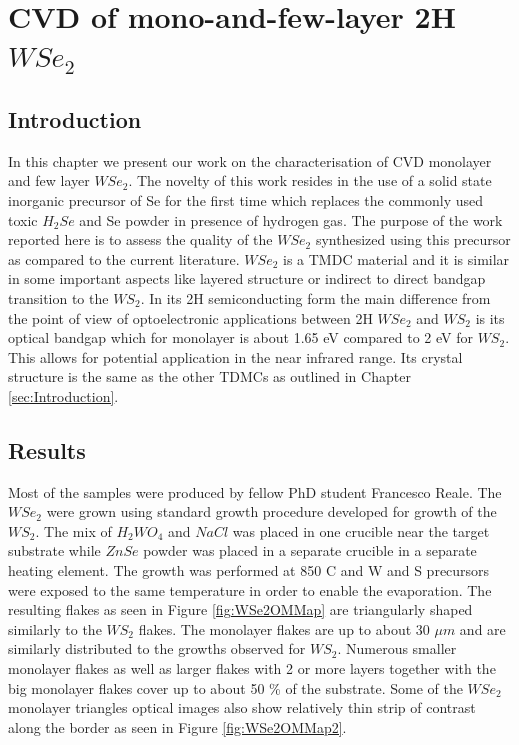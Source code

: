 \chapter{CVD of mono-and-few-layer 2H $WSe_2$}

\section{Introduction}
	
In this chapter we present our work on the characterisation of CVD monolayer and few layer $WSe_2$. The novelty of this work resides in the use of a solid state inorganic precursor of Se for the first time which replaces the commonly used toxic $H_2Se$ and Se powder in presence of hydrogen gas. The purpose of the work reported here is to assess the quality of the $WSe_2$ synthesized using this precursor as compared to the current literature. $WSe_2$ is a TMDC material and it is similar in some important aspects like layered structure or indirect to direct bandgap transition to the $WS_2$. In its 2H semiconducting form the main difference from the point of view of optoelectronic applications between 2H $WSe_2$ and $WS_2$ is its optical bandgap which for monolayer is about 1.65 eV compared to 2 eV for $WS_2$. This allows for potential application in the near infrared range. Its crystal structure is the same as the other TDMCs as outlined in Chapter \ref{sec:Introduction}.
	
\section{Results}

Most of the samples were produced by fellow PhD student Francesco Reale. The $WSe_2$ were grown using standard growth procedure developed for growth of the $WS_2$. The mix of $H_2WO_4$ and $NaCl$ was placed in one crucible near the target substrate while $ZnSe$ powder was placed in a separate crucible in a separate heating element. The growth was performed at 850 {\degree}C and W and S precursors were exposed to the same temperature in order to enable the evaporation. The resulting flakes as seen in Figure \ref{fig:WSe2OMMap} are triangularly shaped similarly to the $WS_2$ flakes. The monolayer flakes are up to about 30 $\mu m$ and are similarly distributed to the growths observed for $WS_2$. Numerous smaller monolayer flakes as well as larger flakes with 2 or more layers together with the big monolayer flakes cover up to about 50 \% of the substrate. Some of the $WSe_2$ monolayer triangles optical images also show relatively thin strip of contrast along the border as seen in Figure \ref{fig:WSe2OMMap2}.

